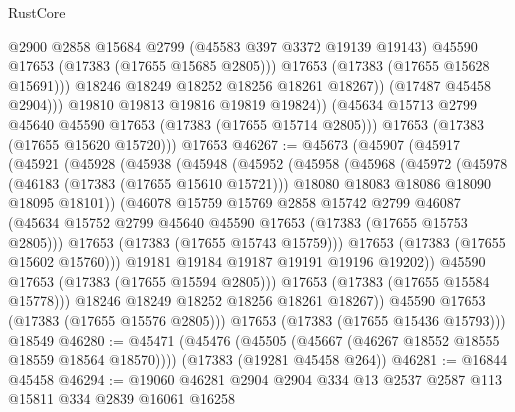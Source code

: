\begin{lexlean}{RustCore}
\begin{coremodule}
                      @2900
                      @2858
                      @15684
                      @2799
                      (@45583 @397 @3372 @19139 @19143)
                      @45590
                      @17653
                      (@17383 (@17655 @15685 @2805)))
                    @17653
                    (@17383 (@17655 @15628 @15691)))
                  @18246
                  @18249
                  @18252
                  @18256
                  @18261
                  @18267))
              (@17487 @45458 @2904)))
          @19810
          @19813
          @19816
          @19819
          @19824))
      (@45634 @15713 @2799 @45640 @45590 @17653 (@17383 (@17655 @15714 @2805)))
      @17653
      (@17383 (@17655 @15620 @15720)))
    @17653
@46267 := @45673
    (@45907
      (@45917
        (@45921
          (@45928
            (@45938
              (@45948
                (@45952
                  (@45958
                    (@45968
                      (@45972
                        (@45978
                          (@46183 (@17383 (@17655 @15610 @15721)))
                          @18080
                          @18083
                          @18086
                          @18090
                          @18095
                          @18101))
                      (@46078
                        @15759
                        @15769
                        @2858
                        @15742
                        @2799
                        @46087
                        (@45634 @15752 @2799 @45640 @45590 @17653 (@17383 (@17655 @15753 @2805)))
                        @17653
                        (@17383 (@17655 @15743 @15759)))
                      @17653
                      (@17383 (@17655 @15602 @15760)))
                    @19181
                    @19184
                    @19187
                    @19191
                    @19196
                    @19202))
                @45590
                @17653
                (@17383 (@17655 @15594 @2805)))
              @17653
              (@17383 (@17655 @15584 @15778)))
            @18246
            @18249
            @18252
            @18256
            @18261
            @18267))
        @45590
        @17653
        (@17383 (@17655 @15576 @2805)))
      @17653
      (@17383 (@17655 @15436 @15793)))
    @18549
@46280 := @45471
    (@45476 (@45505 (@45667 (@46267 @18552 @18555 @18559 @18564 @18570))))
    (@17383 (@19281 @45458 @264))
@46281 := @16844 @45458
@46294 := @19060 @46281 @2904 @2904 @334 @13 @2537 @2587 @113 @15811 @334 @2839 @16061 @16258

\end{coremodule}
\end{lexlean}
